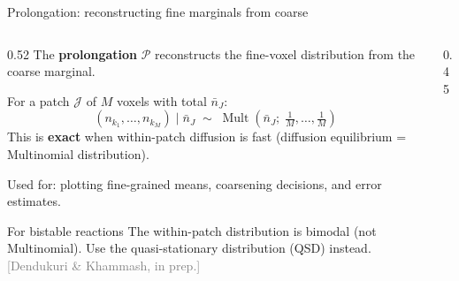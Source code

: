 \documentclass[10pt,aspectratio=169]{beamer}
\newcommand{\Mult}{\operatorname{Mult}}
\newcommand{\citeref}[1]{{\scriptsize\textcolor{gray}{[#1]}}}
\begin{document}
\begin{frame}{Prolongation: reconstructing fine marginals from coarse}

\begin{columns}[T]
\begin{column}{0.52\textwidth}
  The \textbf{prolongation} $\mathcal{P}$ reconstructs the fine-voxel
  distribution from the coarse marginal.

  \bigskip
  For a patch $\mathcal{J}$ of $M$ voxels with total $\bar{n}_J$:
  \[
    (n_{k_1},\ldots,n_{k_M}) \;\Big|\; \bar{n}_J
    \;\sim\; \Mult\!\left(\bar{n}_J;\;\tfrac{1}{M},\ldots,\tfrac{1}{M}\right)
  \]
  This is \textbf{exact} when within-patch diffusion is fast
  (diffusion equilibrium = Multinomial distribution).

  \bigskip
  Used for: plotting fine-grained means, coarsening decisions,
  and error estimates.

  \bigskip
  \begin{block}{For bistable reactions}
    The within-patch distribution is bimodal (not Multinomial).
    Use the quasi-stationary distribution (QSD) instead.
    \citeref{Dendukuri \& Khammash, in prep.}
  \end{block}
\end{column}
\begin{column}{0.45\textwidth}
  \centering
\end{column}
\end{columns}
\end{frame}
\end{document}
